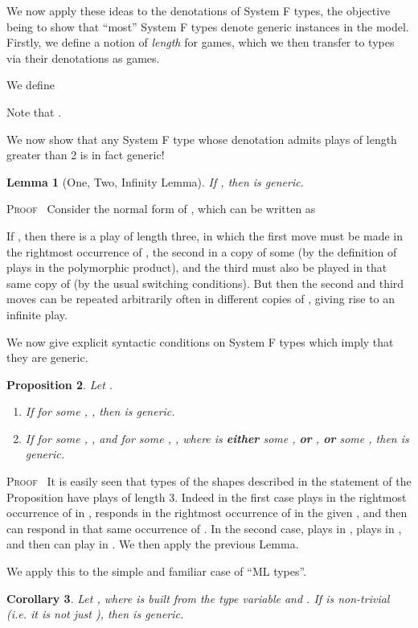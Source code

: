 \documentclass[a4paper,11pt]{article}
\newtheorem{proposition}{Proposition}[section]
\newtheorem{lemma}[proposition]{Lemma}
\newtheorem{corollary}[proposition]{Corollary}
\newenvironment{proof}{\textsc{Proof}\ }{}
\begin{document}
We now apply these ideas to the denotations of System F types, the
objective being to show that ``most'' System F types denote generic
instances in the model.
Firstly, we define a notion of \emph{length} for games, which we then
transfer to types via their denotations as games.

\noindent We define

Note that .

We now show that any System F type whose denotation admits plays of
length greater than 2 is in fact generic!

\begin{lemma}[One, Two, Infinity  Lemma]
If , then  is generic.
\end{lemma}
\begin{proof}
Consider the normal form of , which can be written as

If , then there is a play of length three, in which the
first move must be made in the rightmost occurrence of , the second
in a copy of some  (by the definition of plays in the polymorphic product),
and the third must also be played in that same copy of  (by the usual
switching conditions). But then the second and third moves can be
repeated arbitrarily often in different copies of , giving rise
to an infinite play.
\end{proof}

We now give explicit syntactic conditions on System F types which
imply that they are generic.

\begin{proposition}
Let .
\begin{enumerate}
\item If for some , , then  is generic.
\item If for some , , and for some , , where  is \textbf{either} some ,
\textbf{or} , \textbf{or} some , then  is generic.
\end{enumerate}
\end{proposition}
\begin{proof}
It is easily seen that types of the shapes described in the statement
of the Proposition have
plays of length 3. Indeed in the first case  plays in the rightmost
occurrence of  in ,  responds in the rightmost occurrence of  in
the given , and then  can respond in that same occurrence of
.
In the second case,  plays in ,  plays in , and then 
can play in . We then apply the previous Lemma.
\end{proof}

\noindent We apply this to the simple and familiar case of ``ML types''.
\begin{corollary}
Let , where  is built from the type variable
 and . If  is non-trivial (i.e. it is not just
), then  is generic.
\end{corollary}
\end{document}
